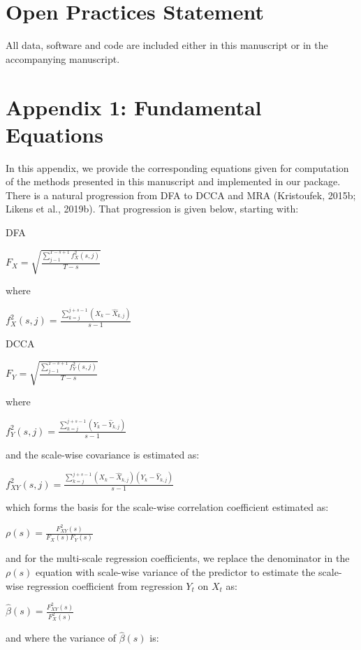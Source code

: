 \documentclass[
  man]{apa6}
\begin{document}
\hypertarget{open-practices-statement}{%
\section{Open Practices Statement}\label{open-practices-statement}}

All data, software and code are included either in this manuscript or in
the accompanying manuscript.

\hypertarget{appendix-1-fundamental-equations}{%
\section{Appendix 1: Fundamental Equations}\label{appendix-1-fundamental-equations}}

In this appendix, we provide the corresponding equations given for
computation of the methods presented in this manuscript and implemented
in our package. There is a natural progression from DFA to DCCA and MRA
(Kristoufek, 2015b; Likens et al., 2019b). That progression is given below,
starting with:

DFA

\(F_X = \sqrt{\frac{\sum^{T-s+1}_{j-1}f^2_X(s,j)}{T-s}}\)

where

\(f^2_X(s,j) = \frac{\sum^{j+s-1}_{k=j}(X_k -\widehat{X}_{k,j})}{s-1}\)

DCCA

\(F_Y = \sqrt{\frac{\sum^{T-s+1}_{j-1}f^2_Y(s,j)}{T-s}}\)

where

\(f^2_Y(s,j) = \frac{\sum^{j+s-1}_{k=j}(Y_k -\widehat{Y}_{k,j})}{s-1}\)

and the scale-wise covariance is estimated as:

\(f^2_{XY}(s,j) = \frac{\sum^{j+s-1}_{k=j}(X_k -\widehat{X}_{k,j})(Y_k -\widehat{Y}_{k,j})}{s-1}\)

which forms the basis for the scale-wise correlation coefficient
estimated as:

\(\rho(s) = \frac{F^2_{XY}(s)}{F_X(s)F_Y(s)}\)

and for the multi-scale regression coefficients, we replace the
denominator in the \(\rho(s)\) equation with scale-wise variance of the
predictor to estimate the scale-wise regression coefficient from
regression \(Y_t\) on \(X_t\) as:

\(\widehat{\beta}(s) = \frac{F^2_{XY}(s)}{F^2_X(s)}\)

and where the variance of \(\widehat{\beta}(s)\) is:
\end{document}
